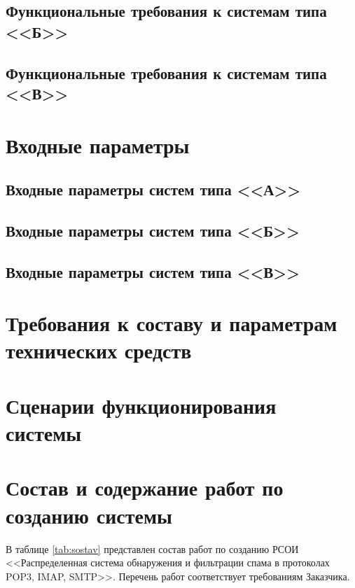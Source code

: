 \subsection{Функциональные требования к системам типа <<Б>>}

 
\subsection{Функциональные требования к системам типа <<В>>}

\section{Входные параметры}
\subsection{Входные параметры систем типа <<А>>}
\subsection{Входные параметры систем типа <<Б>>}
\subsection{Входные параметры систем типа <<В>>}


\section{Требования к составу и параметрам технических средств}

\section{Сценарии функционирования системы}


\section{Состав и содержание работ по созданию системы}
В таблице \ref{tab:sostav} представлен состав работ по созданию РСОИ <<Распределенная система обнаружения и фильтрации спама в протоколах POP3, IMAP, SMTP>>. Перечень работ соответствует требованиям Заказчика.

